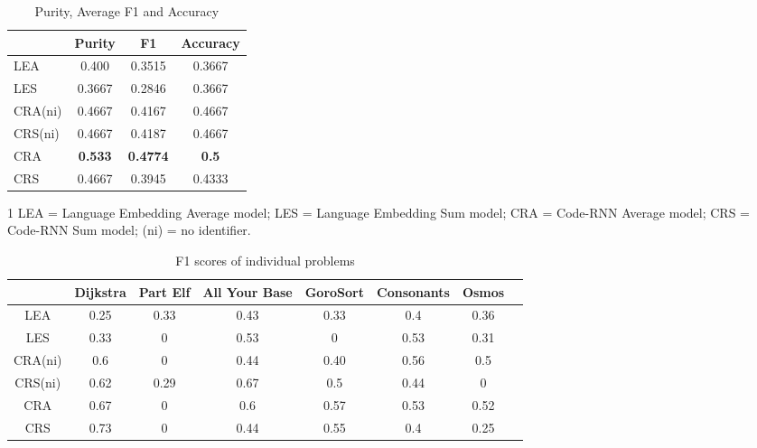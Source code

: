 \begin{table}[th]
\caption{Purity, Average F1 and Accuracy}
\label{table:purity}
\center
\scriptsize{
\begin{tabular}{lccc}
 \hline
 & Purity &  F1 & Accuracy \\ %
 \hline
 LEA & 0.400 &  0.3515  & 0.3667\\%
 LES & 0.3667 & 0.2846 & 0.3667 \\%
CRA(ni) &  0.4667 & 0.4167 & 0.4667\\
CRS(ni) &  0.4667 & 0.4187 & 0.4667 \\
 CRA & \textbf{0.533} &  \textbf{0.4774} & \textbf{0.5} \\%
 CRS & 0.4667 & 0.3945 & 0.4333\\%
 \hline

\end{tabular}

\begin{tablenotes}
  \item[1] LEA = Language Embedding Average model;
  LES = Language Embedding Sum model;
  CRA = Code-RNN Average model;
  CRS = Code-RNN Sum model; (ni) = no identifier.
\end{tablenotes}
}
\end{table}




\begin{table}[th]
\caption{F1 scores of individual problems}
\center
\scriptsize{
\label{table:F1_30}
\begin{tabular}{c@{\ \ \ \ }c@{\ \ \ \ }c@{\ \ \ \ }c@{\ \ \ \ }c@{\ \ \ \ }c@{\ \ \ \ }c@{\ \ \ \ }c}
 \hline
 &Dijkstra&Part Elf&All Your Base&GoroSort&Consonants&Osmos \\
 \hline
 LEA
 & 0.25 & {0.33} & 0.43 & {0.33} & 0.4 & 0.36 \\
 LES
 & 0.33 & 0 & 0.53 & 0 & 0.53 & 0.31 \\
 CRA(ni) & 0.6 & 0 & {0.44} & {0.40} & {0.56} & 0.5 \\

 CRS(ni) & {0.62} & 0.29 & {0.67} & {0.5} & 0.44 & 0 \\
 CRA
 & {0.67} & 0 & {0.6} & {0.57} & {0.53} & {0.52} \\
 CRS
 & {0.73} & {0} & 0.44 & 0.55 & 0.4 & 0.25 \\
\hline
\end{tabular}
}

\end{table}






